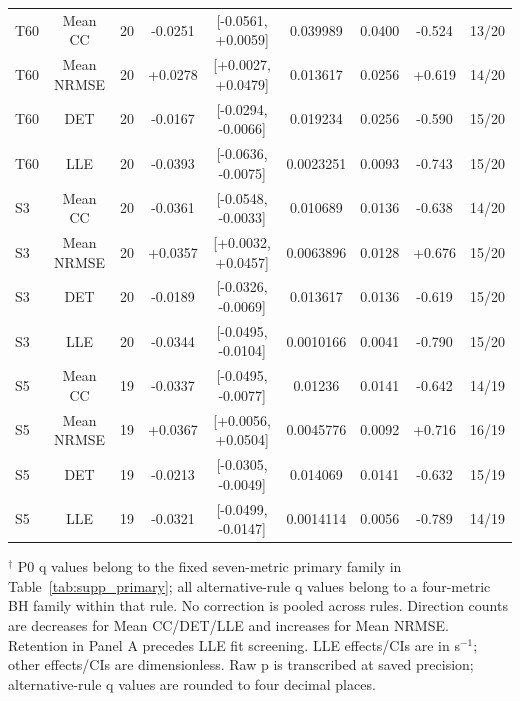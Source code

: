 \begin{table}[p]
{\begin{tabular}{lcccccccc}
T60 & Mean CC & 20 & -0.0251 & [-0.0561, +0.0059] & 0.039989 & 0.0400 & -0.524 & 13/20 \\
T60 & Mean NRMSE & 20 & +0.0278 & [+0.0027, +0.0479] & 0.013617 & 0.0256 & +0.619 & 14/20 \\
T60 & DET & 20 & -0.0167 & [-0.0294, -0.0066] & 0.019234 & 0.0256 & -0.590 & 15/20 \\
T60 & LLE & 20 & -0.0393 & [-0.0636, -0.0075] & 0.0023251 & 0.0093 & -0.743 & 15/20 \\
S3 & Mean CC & 20 & -0.0361 & [-0.0548, -0.0033] & 0.010689 & 0.0136 & -0.638 & 14/20 \\
S3 & Mean NRMSE & 20 & +0.0357 & [+0.0032, +0.0457] & 0.0063896 & 0.0128 & +0.676 & 15/20 \\
S3 & DET & 20 & -0.0189 & [-0.0326, -0.0069] & 0.013617 & 0.0136 & -0.619 & 15/20 \\
S3 & LLE & 20 & -0.0344 & [-0.0495, -0.0104] & 0.0010166 & 0.0041 & -0.790 & 15/20 \\
S5 & Mean CC & 19 & -0.0337 & [-0.0495, -0.0077] & 0.01236 & 0.0141 & -0.642 & 14/19 \\
S5 & Mean NRMSE & 19 & +0.0367 & [+0.0056, +0.0504] & 0.0045776 & 0.0092 & +0.716 & 16/19 \\
S5 & DET & 19 & -0.0213 & [-0.0305, -0.0049] & 0.014069 & 0.0141 & -0.632 & 15/19 \\
S5 & LLE & 19 & -0.0321 & [-0.0499, -0.0147] & 0.0014114 & 0.0056 & -0.789 & 14/19 \\
\bottomrule
\end{tabular}
}
\par\medskip
\begin{minipage}{\textwidth}\footnotesize
$^{\dagger}$ P0 q values belong to the fixed seven-metric primary family in Table~\ref{tab:supp_primary}; all alternative-rule q values belong to a four-metric BH family within that rule. No correction is pooled across rules. Direction counts are decreases for Mean CC/DET/LLE and increases for Mean NRMSE. Retention in Panel A precedes LLE fit screening. LLE effects/CIs are in s$^{-1}$; other effects/CIs are dimensionless. Raw p is transcribed at saved precision; alternative-rule q values are rounded to four decimal places.
\end{minipage}
\end{table}

